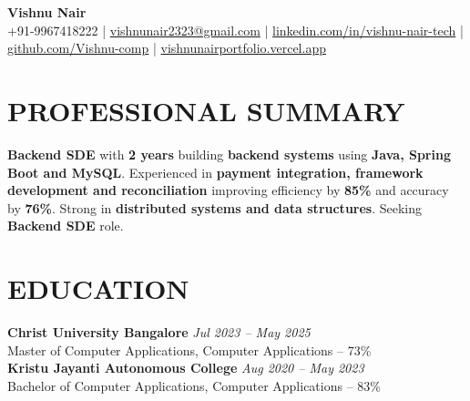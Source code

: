 \documentclass[10pt,a4paper]{article}
\begin{document}

\begin{center}

{\Large \textbf{Vishnu Nair}}\\[4pt]

{\small
+91-9967418222
\quad|\quad
\href{mailto:vishnunair2323@gmail.com}{vishnunair2323@gmail.com}
\quad|\quad
\href{https://linkedin.com/in/vishnu-nair-tech}{linkedin.com/in/vishnu-nair-tech}
\quad|\quad
\href{https://github.com/Vishnu-comp}{github.com/Vishnu-comp}
\quad|\quad
\href{https://vishnunairportfolio.vercel.app}{vishnunairportfolio.vercel.app}
}

\end{center}


\section*{PROFESSIONAL SUMMARY}

\small

\textbf{Backend SDE} with \textbf{2 years} building \textbf{backend systems} using \textbf{Java, Spring Boot and MySQL}. Experienced in \textbf{payment integration, framework development and reconciliation} improving efficiency by \textbf{85\%} and accuracy by \textbf{76\%}. Strong in \textbf{distributed systems and data structures}. Seeking \textbf{Backend SDE} role.


\section*{EDUCATION}
\small
\textbf{Christ University Bangalore} \hfill \textit{Jul 2023 -- May 2025}\\
Master of Computer Applications, Computer Applications -- 73\%\\
\small
\textbf{Kristu Jayanti Autonomous College} \hfill \textit{Aug 2020 -- May 2023}\\
Bachelor of Computer Applications, Computer Applications -- 83\%

\end{document}
